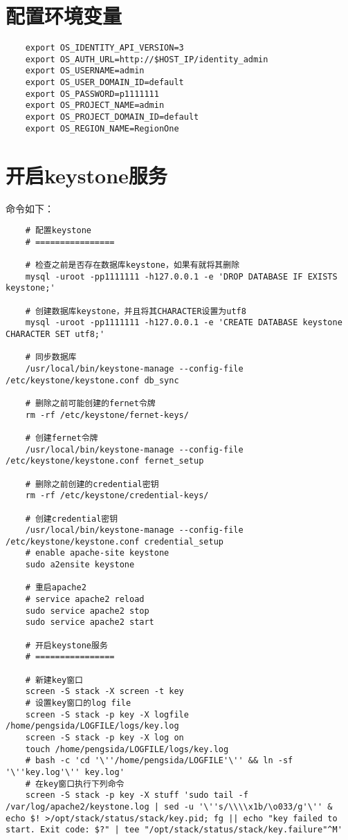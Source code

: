 \documentclass[a4paper,left=1.5cm,right=1.5cm,11pt]{article}
\begin{document}
\section{配置环境变量}
	\begin{lstlisting}
	export OS_IDENTITY_API_VERSION=3
    export OS_AUTH_URL=http://$HOST_IP/identity_admin
    export OS_USERNAME=admin
    export OS_USER_DOMAIN_ID=default
    export OS_PASSWORD=p1111111
    export OS_PROJECT_NAME=admin
    export OS_PROJECT_DOMAIN_ID=default
    export OS_REGION_NAME=RegionOne
	\end{lstlisting}

\section{开启keystone服务}
	命令如下：
	\begin{lstlisting}
	# 配置keystone
	# ================

	# 检查之前是否存在数据库keystone，如果有就将其删除
	mysql -uroot -pp1111111 -h127.0.0.1 -e 'DROP DATABASE IF EXISTS keystone;'

	# 创建数据库keystone，并且将其CHARACTER设置为utf8
	mysql -uroot -pp1111111 -h127.0.0.1 -e 'CREATE DATABASE keystone CHARACTER SET utf8;'

	# 同步数据库
	/usr/local/bin/keystone-manage --config-file /etc/keystone/keystone.conf db_sync

	# 删除之前可能创建的fernet令牌
	rm -rf /etc/keystone/fernet-keys/

	# 创建fernet令牌
	/usr/local/bin/keystone-manage --config-file /etc/keystone/keystone.conf fernet_setup

	# 删除之前创建的credential密钥
	rm -rf /etc/keystone/credential-keys/

	# 创建credential密钥
	/usr/local/bin/keystone-manage --config-file /etc/keystone/keystone.conf credential_setup
	# enable apache-site keystone
	sudo a2ensite keystone

	# 重启apache2
	# service apache2 reload
	sudo service apache2 stop
	sudo service apache2 start

	# 开启keystone服务
	# ================

	# 新建key窗口
	screen -S stack -X screen -t key
	# 设置key窗口的log file
	screen -S stack -p key -X logfile /home/pengsida/LOGFILE/logs/key.log
	screen -S stack -p key -X log on
	touch /home/pengsida/LOGFILE/logs/key.log
	# bash -c 'cd '\''/home/pengsida/LOGFILE'\'' && ln -sf '\''key.log'\'' key.log'
	# 在key窗口执行下列命令
	screen -S stack -p key -X stuff 'sudo tail -f /var/log/apache2/keystone.log | sed -u '\''s/\\\\x1b/\o033/g'\'' & echo $! >/opt/stack/status/stack/key.pid; fg || echo "key failed to start. Exit code: $?" | tee "/opt/stack/status/stack/key.failure"^M'


\end{lstlisting}
\end{document}
